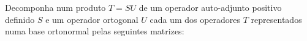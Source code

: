 \documentclass[11pt,a4paper]{article}
\begin{document}
\solucao{}
\begin{exercicio}
Decomponha num produto $T = SU$ de um operador auto-adjunto positivo definido $S$ e um operador ortogonal $U$ cada um dos operadores $T$ representados numa base ortonormal pelas seguintes matrizes:
\end{exercicio}
\end{document}
